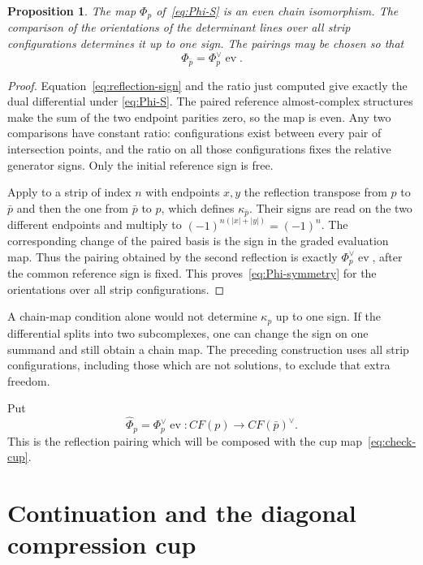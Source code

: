 \documentclass[11pt]{amsart}
\newtheorem{proposition}[theorem]{Proposition}
\theoremstyle{definition}
\theoremstyle{remark}
\theoremstyle{plain}
\numberwithin{equation}{section}
\newcommand{\CF}{\mathit{CF}}
\newcommand{\ev}{\operatorname{ev}}
\begin{document}
\begin{proposition}\label{prop:reflection-pairing}
The map $\Phi_p$ of~\eqref{eq:Phi-S}
is an even chain isomorphism. The
comparison of the orientations of the
determinant lines over all strip
configurations determines it up to one
sign. The
pairings may be chosen so that
\begin{equation}\label{eq:Phi-symmetry}
 \Phi_{\bar p}=\Phi_p^\vee\ev.
\end{equation}
\end{proposition}
\begin{proof}
Equation~\eqref{eq:reflection-sign}
and the ratio just computed give
exactly the dual differential under
\eqref{eq:Phi-S}. The paired reference
almost-complex structures make the sum of the two
endpoint parities zero, so the map
is even. Any two comparisons have
constant ratio: configurations
exist between every pair of
intersection points, and the ratio
on all those configurations fixes
the relative generator signs.
Only the initial reference sign
is free.

Apply to a strip of index $n$ with
endpoints $x,y$ the reflection
transpose from $p$ to $\bar p$ and then
the one from $\bar p$ to $p$, which
defines $\kappa_{\bar p}$. Their signs
are read on the two different endpoints
and multiply to
$(-1)^{n(|x|+|y|)}=(-1)^n$.
The corresponding change of the
paired basis is the sign in the
graded evaluation map. Thus the
pairing obtained by the second
reflection is exactly
$\Phi_p^\vee\ev$, after the common
reference sign is fixed. This
proves~\eqref{eq:Phi-symmetry} for the
orientations over all strip configurations.
\end{proof}

A chain-map condition alone would
not determine $\kappa_p$ up to
one sign. If the differential
splits into two subcomplexes,
one can change the sign on one
summand and still obtain a chain
map. The preceding construction
uses all strip configurations,
including those which are not
solutions, to exclude that extra
freedom.

Put
\begin{equation}\label{eq:hat-Phi}
 \widehat\Phi_p=\Phi_p^\vee\ev:
   \CF(p)\longrightarrow\CF(\bar p)^\vee.
\end{equation}
This is the reflection pairing
which will be composed with the
cup map~\eqref{eq:check-cup}.

\section{Continuation and the diagonal compression cup}
\label{sec:continuation}
\end{document}
